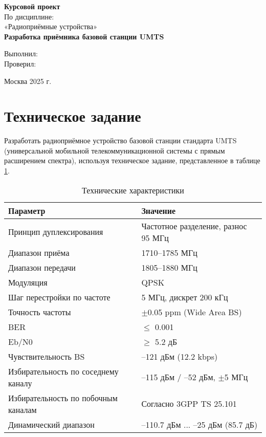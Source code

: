 \documentclass[a4paper,12pt]{article}
\begin{document}
\thispagestyle{empty} %

\vspace*{3cm}

\begin{center}
\large \textbf{Курсовой проект} \\[1em]
\large По дисциплине: \\«Радиоприёмные устройства» \\[1em]
\Largez \textbf{Разработка приёмника базовой станции UMTS} \\[3em]
\end{center}

\vfill %

\begin{flushright}
Выполнил:    \qquad\qquad\qquad \qquad\qquad \\
Проверил:      \qquad\qquad\qquad\qquad\qquad \\[3em]
\end{flushright}

\begin{center}
Москва 2025 г.
\end{center}

\newpage
\tableofcontents
\newpage

\section{Техническое задание}
Разработать радиоприёмное устройство базовой станции стандарта UMTS (универсальной мобильной телекоммуникационной системы с прямым расширением спектра), используя техническое задание, представленное в таблице \ref{tab:t1}.

\begin{table}[H]
\centering
\caption{Технические характеристики}
\label{tab:t1}
\begin{tabular}{|l|l|}
\hline
\textbf{Параметр} & \textbf{Значение} \\ \hline
Принцип дуплексирования & Частотное разделение, разнос 95 МГц \\ \hline
Диапазон приёма & 1710--1785 МГц \\ \hline
Диапазон передачи & 1805--1880 МГц \\ \hline
Модуляция & QPSK \\ \hline
Шаг перестройки по частоте & 5 МГц, дискрет 200 кГц \\ \hline
Точность частоты & $\pm$0.05 ppm (Wide Area BS) \\ \hline
BER & $\leq$ 0.001 \\ \hline
Eb/N0 & $\geq$ 5.2 дБ \\ \hline
Чувствительность BS & --121 дБм (12.2 kbps) \\ \hline
Избирательность по соседнему каналу & --115 дБм / --52 дБм, $\pm$5 МГц \\ \hline
Избирательность по побочным каналам & Согласно 3GPP TS 25.101 \\ \hline
Динамический диапазон & --110.7 дБм ... --25 дБм (85.7 дБ) \\ \hline
\end{tabular}
\end{table}
\end{document}
